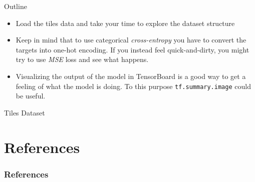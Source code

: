 \documentclass[aspectratio=169]{beamer}
\begin{document}

\begin{frame}{Outline}
\begin{itemize}
\item Load the tiles data and take your time to explore the dataset structure
\item Keep in mind that to use categorical \textit{cross-entropy} you have to convert the targets into one-hot encoding. If you instead feel quick-and-dirty, you might try to use \textit{MSE} loss and see what happens.
\item Visualizing the output of the model in TensorBoard is a good way to get a feeling of what the model is doing. To this purpose \texttt{tf.summary.image} could be useful.
\end{itemize}
\end{frame}


\begin{frame}{Tiles Dataset}
\end{frame}



\section{References}

\begin{frame}[t, allowframebreaks]
\frametitle{References}


\end{frame}
\end{document}
